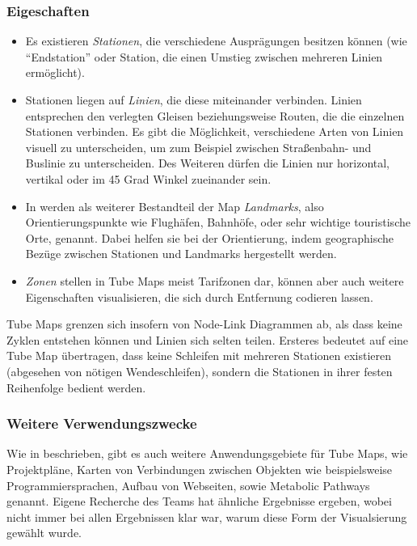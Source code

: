 \subsubsection{Eigeschaften}
\begin{itemize}
\item Es existieren \emph{Stationen}, die verschiedene Ausprägungen besitzen können (wie "`Endstation"' oder Station, die einen Umstieg zwischen mehreren Linien ermöglicht). 
\item Stationen liegen auf \emph{Linien}, die diese miteinander verbinden. Linien entsprechen den verlegten Gleisen beziehungsweise Routen, die die einzelnen Stationen verbinden. Es gibt die Möglichkeit, verschiedene Arten von Linien visuell zu unterscheiden, um zum Beispiel zwischen Straßenbahn- und Buslinie zu unterscheiden. Des Weiteren dürfen die Linien nur horizontal, vertikal oder im 45 Grad Winkel zueinander sein. 
\item In \cite{automaticlayoutmetro08} werden als weiterer Bestandteil der Map \emph{Landmarks}, also Orientierungspunkte wie Flughäfen, Bahnhöfe, oder sehr wichtige touristische Orte, genannt. Dabei helfen sie bei der Orientierung, indem geographische Bezüge zwischen Stationen und Landmarks hergestellt werden.
\item \emph{Zonen} stellen in Tube Maps meist Tarifzonen dar, können aber auch weitere Eigenschaften visualisieren, die sich durch Entfernung codieren lassen. 
\end{itemize}
Tube Maps grenzen sich insofern von Node-Link Diagrammen ab, als dass keine Zyklen entstehen können und Linien sich selten teilen. Ersteres bedeutet auf eine Tube Map übertragen, dass keine Schleifen mit mehreren Stationen existieren (abgesehen von nötigen Wendeschleifen), sondern die Stationen in ihrer festen Reihenfolge bedient werden. 

\subsubsection{Weitere Verwendungszwecke}
\label{tm:verwendungszwecke}
Wie in \cite{automaticlayoutmetro08} beschrieben, gibt es auch weitere Anwendungsgebiete für Tube Maps, wie Projektpläne, Karten von Verbindungen zwischen Objekten wie beispielsweise Programmiersprachen, Aufbau von Webseiten, sowie Metabolic Pathways genannt. Eigene Recherche des Teams hat ähnliche Ergebnisse ergeben, wobei nicht immer bei allen Ergebnissen klar war, warum diese Form der Visualsierung gewählt wurde. 

